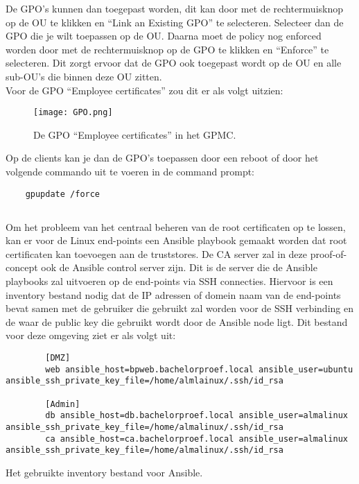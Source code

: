 De GPO's kunnen dan toegepast worden, dit kan door met de rechtermuisknop op de OU te klikken en ``Link an Existing GPO'' te selecteren. Selecteer dan de GPO die je wilt toepassen op de OU. Daarna moet de policy nog enforced worden door met de rechtermuisknop op de GPO te klikken en ``Enforce'' te selecteren. Dit zorgt ervoor dat de GPO ook toegepast wordt op de OU en alle sub-OU's die binnen deze OU zitten. \\
Voor de GPO ``Employee certificates'' zou dit er als volgt uitzien:

\begin{figure}[H]
  \centering
  \texttt{[image: GPO.png]}
  \caption[De GPO ``Employee certificates'' in  het GPMC]{\label{fig:GPO} De GPO ``Employee certificates'' in  het GPMC.}
\end{figure}


Op de clients kan je dan de GPO's toepassen door een reboot of door het volgende commando uit te voeren in de command prompt:
\begin{verbatim}
    gpupdate /force
\end{verbatim}

\pagebreak

\subsection{}
\label{subsec:Oplossing_voor_Linux_end-points_met_Ansible}

Om het probleem van het centraal beheren van de root certificaten op te lossen, kan er voor de Linux end-points een Ansible playbook gemaakt worden dat root certificaten kan toevoegen aan de truststores.
De CA server zal in deze proof-of-concept ook de Ansible control server zijn. Dit is de server die de Ansible playbooks zal uitvoeren op de end-points via SSH connecties.
Hiervoor is een inventory bestand nodig dat de IP adressen of domein naam van de end-points bevat samen met de gebruiker die gebruikt zal worden voor de SSH verbinding en de waar de public key die gebruikt wordt door de Ansible node ligt. Dit bestand voor deze omgeving ziet er als volgt uit: \\

\begin{listing}[H]
    \begin{verbatim}
        [DMZ]
        web ansible_host=bpweb.bachelorproef.local ansible_user=ubuntu ansible_ssh_private_key_file=/home/almlainux/.ssh/id_rsa

        [Admin]
        db ansible_host=db.bachelorproef.local ansible_user=almalinux ansible_ssh_private_key_file=/home/almalinux/.ssh/id_rsa
        ca ansible_host=ca.bachelorproef.local ansible_user=almalinux ansible_ssh_private_key_file=/home/almalinux/.ssh/id_rsa
    \end{verbatim}
    \caption[Inventory file voor Ansible]{Het gebruikte inventory bestand voor Ansible.}
\end{listing}

